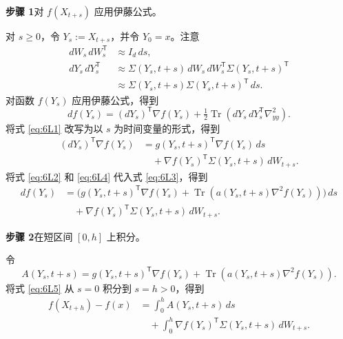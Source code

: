 \textbf{步骤 1}\quad 对 $f(X_{t+s})$ 应用伊藤公式。

对 $s\geq0$，令 $Y_s:=X_{t+s}$，并令 $Y_0=x$。注意
\begin{equation*}
  \begin{aligned}
    dW_s\,dW_s^{\mathsf T}&\approx I_d\,ds,\\
    dY_s\,dY_s^{\mathsf T}
      &\approx\Sigma(Y_s,t+s)\,dW_s\,dW_s^{\mathsf T}\Sigma(Y_s,t+s)^{\mathsf T}\\
      &\approx\Sigma(Y_s,t+s)\Sigma(Y_s,t+s)^{\mathsf T}\,ds.
  \end{aligned}
  \tag{6L2}\label{eq:6L2}
\end{equation*}
对函数 $f(Y_s)$ 应用伊藤公式，得到
\begin{equation*}
  df(Y_s)=(dY_s)^{\mathsf T}\nabla f(Y_s)
        +\tfrac12\operatorname{Tr}(dY_s\,dY_s^{\mathsf T}\nabla^2_{yy}).
  \tag{6L3}\label{eq:6L3}
\end{equation*}
将式 \eqref{eq:6L1} 改写为以 $s$ 为时间变量的形式，得到
\begin{equation*}
  \begin{aligned}
   (dY_s)^{\mathsf T}\nabla f(Y_s)
    &=g(Y_s,t+s)^{\mathsf T}\nabla f(Y_s)\,ds\\
    &\quad+\nabla f(Y_s)^{\mathsf T}\Sigma(Y_s,t+s)\,dW_{t+s}.
  \end{aligned}
  \tag{6L4}\label{eq:6L4}
\end{equation*}
将式 \eqref{eq:6L2} 和 \eqref{eq:6L4} 代入式 \eqref{eq:6L3}，得到
\begin{equation*}
  \begin{aligned}
    df(Y_s)&=\bigl(g(Y_s,t+s)^{\mathsf T}\nabla f(Y_s)
                  +\operatorname{Tr}(a(Y_s,t+s)\nabla^2 f(Y_s))\bigr)\,ds\\
           &\quad+\nabla f(Y_s)^{\mathsf T}\Sigma(Y_s,t+s)\,dW_{t+s}.
  \end{aligned}
  \tag{6L5}\label{eq:6L5}
\end{equation*}

\textbf{步骤 2}\quad 在短区间 $[0,h]$ 上积分。

令
\begin{equation*}
  A(Y_s,t+s)=g(Y_s,t+s)^{\mathsf T}\nabla f(Y_s)
       +\operatorname{Tr}(a(Y_s,t+s)\nabla^2 f(Y_s)).
  \tag{6L6}\label{eq:6L6}
\end{equation*}
将式 \eqref{eq:6L5} 从 $s=0$ 积分到 $s=h>0$，得到
\begin{equation*}
  \begin{aligned}
    f(X_{t+h})-f(x)
     &=\int_0^h A(Y_s,t+s)\,ds\\
     &\quad+\int_0^h\nabla f(Y_s)^{\mathsf T}\Sigma(Y_s,t+s)\,dW_{t+s}.
  \end{aligned}
  \tag{6L7}\label{eq:6L7}
\end{equation*}

